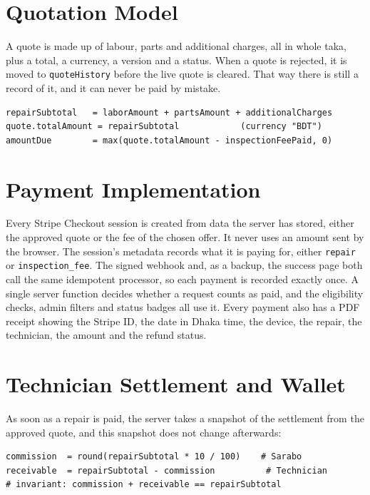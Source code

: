\documentclass{standalone}
\begin{document}
\section{Quotation Model}
A quote is made up of labour, parts and additional charges, all in whole taka, plus a total, a currency, a version and a status. When a quote is rejected, it is moved to \texttt{quoteHistory} before the live quote is cleared. That way there is still a record of it, and it can never be paid by mistake.

\begin{lstlisting}[caption={Quote total and amount still to pay},label={lst:quote}]
repairSubtotal   = laborAmount + partsAmount + additionalCharges
quote.totalAmount = repairSubtotal            (currency "BDT")
amountDue        = max(quote.totalAmount - inspectionFeePaid, 0)
\end{lstlisting}

\section{Payment Implementation}
Every Stripe Checkout session is created from data the server has stored, either the approved quote or the fee of the chosen offer. It never uses an amount sent by the browser. The session's metadata records what it is paying for, either \texttt{repair} or \texttt{inspection\_fee}. The signed webhook and, as a backup, the success page both call the same idempotent processor, so each payment is recorded exactly once. A single server function decides whether a request counts as paid, and the eligibility checks, admin filters and status badges all use it. Every payment also has a PDF receipt showing the Stripe ID, the date in Dhaka time, the device, the repair, the technician, the amount and the refund status.

\section{Technician Settlement and Wallet}
As soon as a repair is paid, the server takes a snapshot of the settlement from the approved quote, and this snapshot does not change afterwards:

\begin{lstlisting}[caption={Settlement rule (whole taka)},label={lst:settlement}]
commission  = round(repairSubtotal * 10 / 100)    # Sarabo
receivable  = repairSubtotal - commission          # Technician
# invariant: commission + receivable == repairSubtotal
\end{lstlisting}
\end{document}
